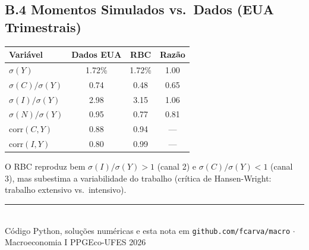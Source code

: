 \documentclass[12pt, a4paper]{article}
\begin{document}
\subsection*{B.4 Momentos Simulados vs.\ Dados (EUA Trimestrais)}

\begin{center}
\begin{tabular}{lccc}
\toprule
Variável & Dados EUA & RBC & Razão \\
\midrule
$\sigma(Y)$ & 1.72\% & 1.72\% & 1.00 \\
$\sigma(C)/\sigma(Y)$ & 0.74 & 0.48 & 0.65 \\
$\sigma(I)/\sigma(Y)$ & 2.98 & 3.15 & 1.06 \\
$\sigma(N)/\sigma(Y)$ & 0.95 & 0.77 & 0.81 \\
$\text{corr}(C,Y)$ & 0.88 & 0.94 & --- \\
$\text{corr}(I,Y)$ & 0.80 & 0.99 & --- \\
\bottomrule
\end{tabular}
\end{center}

O RBC reproduz bem $\sigma(I)/\sigma(Y) > 1$ (canal 2) e $\sigma(C)/\sigma(Y) < 1$ (canal 3), mas subestima a variabilidade do trabalho (crítica de Hansen-Wright: trabalho extensivo vs.\ intensivo).

\vfill
\begin{center}
\rule{0.5\linewidth}{0.4pt}\\[0.5em]
{\small Código Python, soluções numéricas e esta nota em \texttt{github.com/fcarva/macro} $\cdot$ Macroeconomia I PPGEco-UFES 2026}
\end{center}
\end{document}

